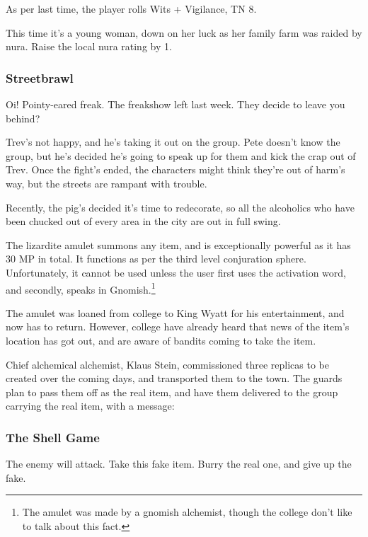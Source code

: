 As per last time, the player rolls Wits + Vigilance, TN 8.

This time it's a young woman, down on her luck as her family farm was raided by nura.  Raise the local nura rating by 1.


\humanthief

\subsubsection{Streetbrawl}
\begin{boxtext}
	Oi! Pointy-eared freak.  The freakshow left last week.  They decide to leave you behind?
\end{boxtext}

Trev's not happy, and he's taking it out on the group.  Pete doesn't know the group, but he's decided he's going to speak up for them and kick the crap out of Trev.  Once the fight's ended, the characters might think they're out of harm's way, but the streets are rampant with trouble.

Recently, the \gls{pig}'s decided it's time to redecorate, so all the alcoholics who have been chucked out of every area in the city are out in full swing.


\humanfarmer


The lizardite amulet summons any item, and is exceptionally powerful as it has 30 MP in total.  It functions as per the third level conjuration sphere.  Unfortunately, it cannot be used unless the user first uses the activation word, and secondly, speaks in Gnomish.\footnote{The amulet was made by a gnomish alchemist, though the college don't like to talk about this fact.}

The amulet was loaned from \gls{college} to King Wyatt for his entertainment, and now has to return.  However, \gls{college} have already heard that news of the item's location has got out, and are aware of bandits coming to take the item.

Chief alchemical alchemist, Klaus Stein, commissioned three replicas to be created over the coming days, and transported them to the town.  The guards plan to pass them off as the real item, and have them delivered to the group carrying the real item, with a message:

\subsubsection{The Shell Game}
\begin{boxtext}
	The enemy will attack. Take this fake item.  Burry the real one, and give up the fake.
\end{boxtext}

